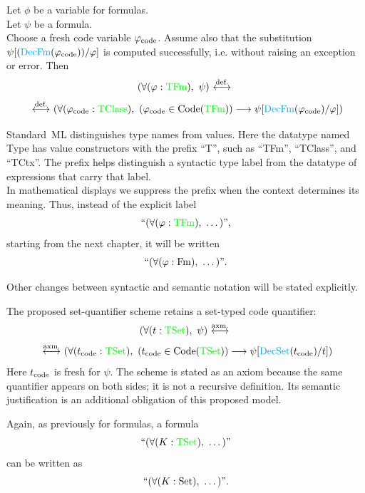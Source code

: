 \begin{definition}
Let $\phi$ be a variable for formulas.\\
Let $\psi$ be a formula.\\
Choose a fresh code variable $\varphi_{\text{code}}$. Assume also that the substitution
$\psi[({\text{\textcolor{cyan}{DecFm}}}(\varphi_{\text{code}}))/\varphi]$ is computed successfully, i.e. without raising an exception or error.
Then
\[
(\forall (\varphi:{\text{\textcolor{green}{TFm}}}),\ \psi)
\ {\stackrel{{\textrm{def.}}}{\longleftrightarrow}}\ 
\]
\[
\iffdef
(\forall (\phi_\code:\TClass),\ %
(\phi_\code\in \operatorname{Code}(\TFm))
\implies
\psi[
\DecFm(\phi_\code)
/
\phi
]
)
\]
\end{definition}
\begin{notation}
Standard~ML distinguishes type names from values. Here the datatype named
Type has value constructors with the prefix ``T'', such as ``TFm'',
``TClass'', and ``TCtx''. The prefix helps distinguish a syntactic type label
from the datatype of expressions that carry that label.\\
In mathematical displays we suppress the prefix when the context determines
its meaning. Thus, instead of the explicit label
\[
``(\forall(\varphi:{\text{\textcolor{green}{TFm}}}),\ \dots)",
\]
starting from the next chapter, it will be written
\[
``(\forall(\varphi:\mathrm{Fm}),\ \dots)".
\]
\end{notation}

Other changes between syntactic and semantic notation will be stated explicitly.%



\begin{axiom}
The proposed set-quantifier scheme retains a set-typed code quantifier:
\[
(\forall (t:{\text{\textcolor{green}{TSet}}}),\ \psi)
\ {\stackrel{{\textrm{axm.}}}{\longleftrightarrow}}\ 
\]
\[
\iffaxm
(\forall (t_\code:\TSet),\ %
(t_\code\in \operatorname{Code}(\TSet))
\implies
\psi[
\DecSet(t_\code)
/
t
]
)
\]
Here $t_{\text{code}}$ is fresh for $\psi$. The scheme is stated as an axiom because
the same quantifier appears on both sides; it is not a recursive definition.
Its semantic justification is an additional obligation of this proposed model.
\end{axiom}
\begin{notation}
Again, as previously for formulas, a formula
\[
``(\forall(K:{\text{\textcolor{green}{TSet}}}),\ \dots)"
\]
can be written as
\[
``(\forall(K:{\textrm{Set}}),\ \dots)".
\]

\end{notation}

